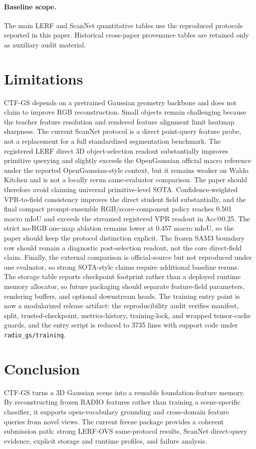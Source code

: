 \documentclass[10pt,twocolumn,letterpaper]{article}
\newcommand{\method}{CTF-GS}
\begin{document}
\paragraph{Baseline scope.}
The main LERF and ScanNet quantitative tables use the reproduced protocols
reported in this paper. Historical cross-paper provenance tables are retained
only as auxiliary audit material.

\section{Limitations}

\method{} depends on a pretrained Gaussian geometry backbone and does not claim
to improve RGB reconstruction. Small objects remain challenging because the
teacher feature resolution and rendered feature alignment limit heatmap
sharpness. The current ScanNet protocol is a direct point-query feature probe,
not a replacement for a full standardized segmentation benchmark. The registered
LERF direct 3D object-selection readout substantially improves primitive querying
and slightly exceeds the OpenGaussian official macro reference under the reported
OpenGaussian-style context, but it remains weaker on Waldo Kitchen and is not a
locally rerun same-evaluator comparison. The paper should therefore avoid
claiming universal primitive-level SOTA. Confidence-weighted VPR-to-field
consistency improves the direct student field substantially, and the final
compact prompt-ensemble RGB/score-component policy reaches 0.501 macro mIoU and exceeds
the streamed registered VPR readout in Acc@0.25. The strict no-RGB one-map
ablation remains lower at 0.457 macro mIoU, so the paper should keep the
protocol distinction explicit. The frozen SAM3
boundary row should remain a diagnostic post-selection readout, not the core
direct-field claim. Finally,
the external comparison is official-source but not reproduced under one evaluator, so
strong SOTA-style claims require additional baseline reruns. The storage table
reports checkpoint footprint rather than a deployed runtime memory allocator, so
future packaging should separate feature-field parameters, rendering buffers, and
optional downstream heads.
The training entry point is now a modularized release artifact: the
reproducibility audit verifies manifest, split, trusted-checkpoint,
metrics-history, training-lock, and wrapped tensor-cache guards, and the
entry script is reduced to 3735 lines with support code under
\texttt{radio\_gs/training}.

\section{Conclusion}

\method{} turns a 3D Gaussian scene into a reusable foundation-feature memory.
By reconstructing frozen RADIO features rather than training a scene-specific
classifier, it supports open-vocabulary grounding and cross-domain feature
queries from novel views. The current freeze package provides a coherent
submission path: strong LERF-OVS same-protocol results, ScanNet direct-query
evidence, explicit storage and runtime profiles, and failure analysis.



\end{document}
